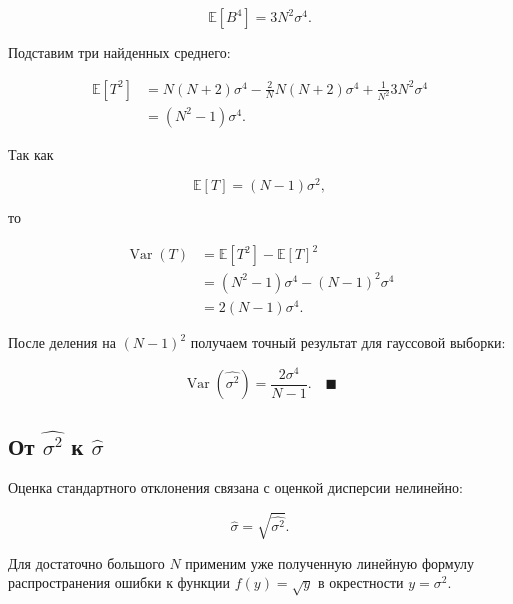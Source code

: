 \documentclass[
  russian,
  12pt,
  a4paper,
  a4paper,
  openany]{scrbook}
\begin{document}
\begin{bookderivation}
\[
\boxed{
\mathbb E[B^4]=3N^2\sigma^4.
}
\]

Подставим три найденных среднего:

\[
\begin{aligned}
\mathbb E[T^2]
&=N(N+2)\sigma^4
-\frac{2}{N}N(N+2)\sigma^4
+\frac{1}{N^2}3N^2\sigma^4\\
&=(N^2-1)\sigma^4.
\end{aligned}
\]

Так как

\[
\mathbb E[T]=(N-1)\sigma^2,
\]

то

\[
\begin{aligned}
\operatorname{Var}(T)
&=\mathbb E[T^2]-\mathbb E[T]^2\\
&=(N^2-1)\sigma^4-(N-1)^2\sigma^4\\
&=2(N-1)\sigma^4.
\end{aligned}
\]

После деления на \((N-1)^2\) получаем точный результат для гауссовой
выборки:

\[
\boxed{
\operatorname{Var}(\widehat{\sigma^2})
=\frac{2\sigma^4}{N-1}.
}
\quad\blacksquare
\]

\end{bookderivation}

\subsection{\texorpdfstring{От \(\widehat{\sigma^2}\) к
\(\widehat\sigma\)}{От \textbackslash widehat\{\textbackslash sigma\^{}2\} к \textbackslash widehat\textbackslash sigma}}\label{ux43eux442-widehatsigma2-ux43a-widehatsigma}

Оценка стандартного отклонения связана с оценкой дисперсии нелинейно:

\[
\widehat\sigma=\sqrt{\widehat{\sigma^2}}.
\]

Для достаточно большого \(N\) применим уже полученную линейную формулу
распространения ошибки к функции \(f(y)=\sqrt y\) в окрестности
\(y=\sigma^2\).
\end{document}
